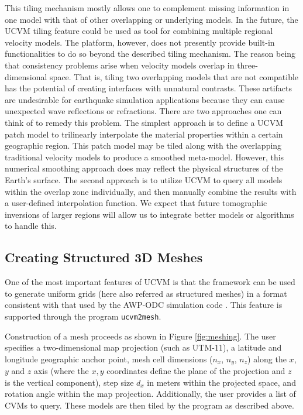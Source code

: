 This tiling mechanism mostly allows one to complement missing information in one model with that of other overlapping or underlying models. In the future, the UCVM tiling feature could be used as tool for combining multiple regional velocity models. The platform, however, does not presently provide built-in functionalities to do so beyond the described tiling mechanism. The reason being that consistency problems arise when velocity models overlap in three-dimensional space. That is, tiling two overlapping models that are not compatible has the potential of creating interfaces with unnatural contrasts. These artifacts are undesirable for earthquake simulation applications because they can cause unexpected wave reflections or refractions. There are two approaches one can think of to remedy this problem. The simplest approach is to define a UCVM patch model to trilinearly interpolate the material properties within a certain geographic region. This patch model may be tiled along with the overlapping traditional velocity models to produce a smoothed meta-model. However, this numerical smoothing approach does may reflect the physical structures of the Earth's surface. The second approach is to utilize UCVM to query all models within the overlap zone individually, and then manually combine the results with a user-defined interpolation function. We expect that future tomographic inversions of larger regions will allow us to integrate better models or algorithms to handle this.



\subsection{Creating Structured 3D Meshes}

One of the most important features of UCVM is that the framework can be used to generate uniform grids (here also referred as structured meshes) in a format consistent with that used by the AWP-ODC simulation code \citep{Cui_2010_Proc}. This feature is supported through the program \texttt{ucvm2mesh}.

Construction of a mesh proceeds as shown in Figure \ref{fig:meshing}. The user specifies a two-dimensional map projection (such as UTM-11), a latitude and longitude geographic anchor point, mesh cell dimensions ($n_x$, $n_y$, $n_z$) along the $x$, $y$ and $z$ axis (where the $x,y$ coordinates define the plane of the projection and $z$ is the vertical component), step size $d_x$ in meters within the projected space, and rotation angle within the map projection. Additionally, the user provides a list of CVMs to query. These models are then tiled by the program as described above.

